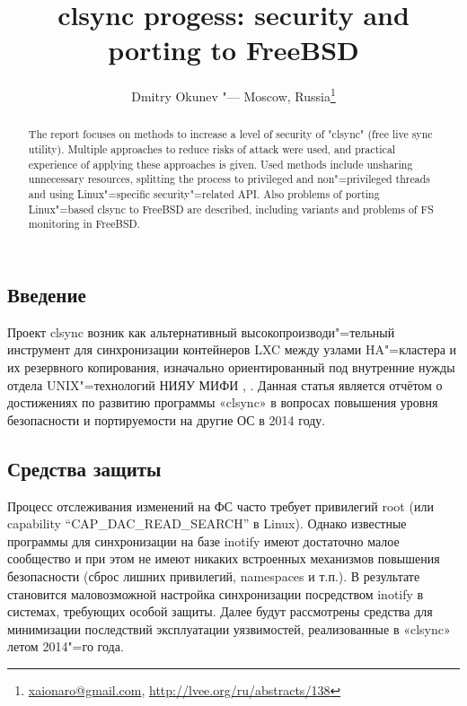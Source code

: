 \documentclass[10pt, a5paper]{article}
\begin{document}
\title{clsync progess: security and porting to FreeBSD}
\author{Dmitry Okunev "--- Moscow, Russia\footnote{\url{xaionaro@gmail.com}, \url{http://lvee.org/ru/abstracts/138}}}
\maketitle
\begin{abstract}
The report focuses on methods to increase a level of security of "clsync" (free live sync utility). Multiple approaches to reduce risks of attack were used, and practical experience of applying these approaches is given. Used methods include unsharing un\-necessary resources, splitting the process to privileged and non"=privileged threads and using Linux"=specific security"=related API. Also problems of porting Linux"=based clsync to FreeBSD are described, including variants and problems of FS monitoring in FreeBSD.
\end{abstract}
\subsection*{Введение}

Проект clsync возник как альтернативный высокопроизводи"=\linebreak тельный инструмент для синхронизации контейнеров LXC между узлами HA"=кластера и их резервного копирования, изначально ориентированный под внутренние нужды отдела UNIX"=технологий НИЯУ МИФИ \cite{Okunev1}, \cite{Okunev2}. Данная статья является отчётом о достижениях по развитию программы «clsync» в вопросах повышения уровня безопасности и портируемости на другие ОС в 2014 году.

\subsection*{Средства защиты}

Процесс отслеживания изменений на ФС часто требует  привилегий root (или capability ``CAP\_DAC\_READ\_SEARCH'' \cite{Okunev3} в Linux). Однако известные программы \cite{Okunev4} для синхронизации на базе inotify \cite{Okunev5} имеют достаточно малое сообщество и при этом не имеют никаких встроенных механизмов повышения безопасности (сброс лишних привилегий, namespaces и т.п.). В результате становится маловозможной настройка синхронизации посредством inotify в системах, требующих особой защиты. Далее будут рассмотрены средства для минимизации последствий эксплуатации уязвимостей, реализованные в «clsync» летом 2014"=го года.
\end{document}
